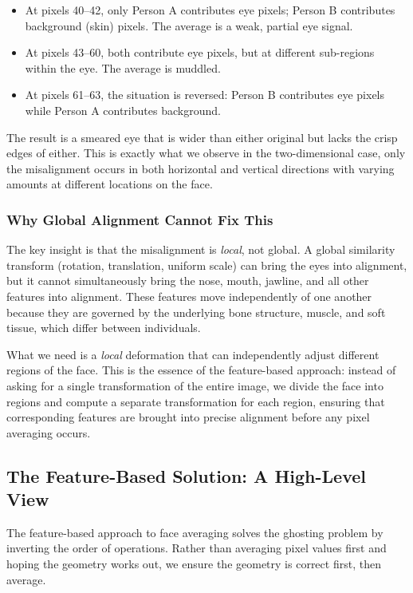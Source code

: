 \begin{itemize}
    \item At pixels 40--42, only Person A contributes eye pixels; Person B contributes background
    (skin) pixels. The average is a weak, partial eye signal.
    \item At pixels 43--60, both contribute eye pixels, but at different sub-regions within the
    eye. The average is muddled.
    \item At pixels 61--63, the situation is reversed: Person B contributes eye pixels while Person
    A contributes background.
\end{itemize}

The result is a smeared eye that is wider than either original but lacks the crisp edges of either.
This is exactly what we observe in the two-dimensional case, only the misalignment occurs in both
horizontal and vertical directions with varying amounts at different locations on the face.

\subsubsection{Why Global Alignment Cannot Fix This}

The key insight is that the misalignment is \emph{local}, not global. A global similarity
transform (rotation, translation, uniform scale) can bring the eyes into alignment, but it cannot
simultaneously bring the nose, mouth, jawline, and all other features into alignment. These
features move independently of one another because they are governed by the underlying bone
structure, muscle, and soft tissue, which differ between individuals.

What we need is a \emph{local} deformation that can independently adjust different regions of
the face. This is the essence of the feature-based approach: instead of asking for a single
transformation of the entire image, we divide the face into regions and compute a separate
transformation for each region, ensuring that corresponding features are brought into precise
alignment before any pixel averaging occurs.


\subsection{The Feature-Based Solution: A High-Level View}

The feature-based approach to face averaging solves the ghosting problem by inverting the order of
operations. Rather than averaging pixel values first and hoping the geometry works out, we ensure
the geometry is correct first, then average.

